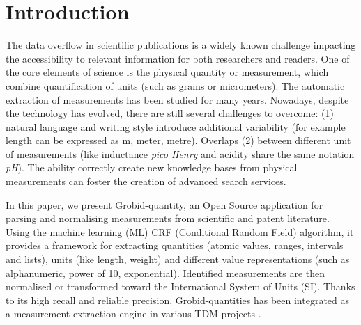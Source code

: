 \documentclass[sigconf]{acmart}
\begin{document}


\maketitle

\section{Introduction}

The data overflow in scientific publications is a widely known challenge impacting the accessibility to relevant information for both researchers and readers. 
One of the core elements of science is the physical quantity or measurement, which combine quantification of units (such as grams or micrometers). The automatic extraction of measurements has been studied for many years. Nowadays, despite the technology has evolved, there are still several challenges to overcome: (1) natural language and writing style introduce additional variability (for example length can be expressed as m, meter, metre). Overlaps (2) between different unit of measurements (like inductance \textit{pico Henry} and acidity share the same notation \textit{pH}). The ability correctly create new knowledge bases from physical measurements can foster the creation of advanced search services. 

In this paper, we present Grobid-quantity, an Open Source application \cite{grobid-quantities} for parsing and normalising measurements from scientific and patent literature. Using the machine learning (ML) CRF (Conditional Random Field) algorithm, it provides a framework for extracting quantities (atomic values, ranges, intervals and lists), units (like length, weight) and different value representations (such as alphanumeric, power of 10, exponential). Identified measurements are then normalised or transformed toward the International System of Units (SI). Thanks to its high recall and reliable precision, Grobid-quantities has been integrated as a measurement-extraction engine in various TDM projects \cite{foppiano2019proposal}.
\end{document}
